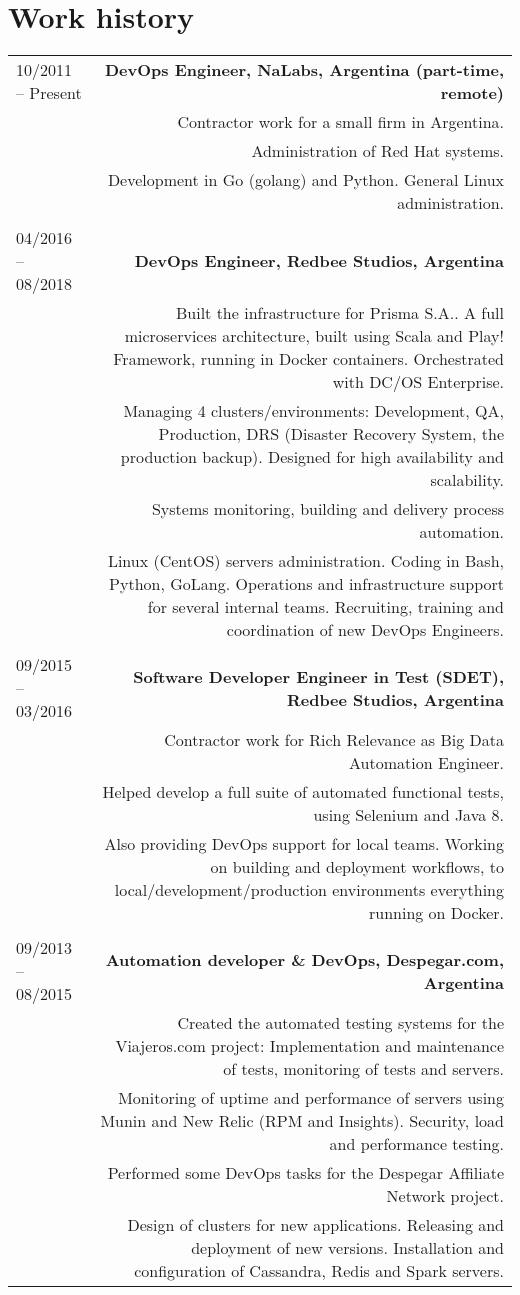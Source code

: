 \documentclass{vitae}
\begin{document}
\section*{Work history}
\begin{tabular}{L!{\VRule}R}
10/2011 -- Present&{\bf DevOps Engineer, NaLabs, Argentina (part-time, remote)}\\
&Contractor work for a small firm in Argentina.\\
&Administration of Red Hat systems.\\
&Development in Go (golang) and Python. General Linux administration.\\
\\
04/2016 -- 08/2018&{\bf DevOps Engineer, Redbee Studios, Argentina}\\
&Built the infrastructure for Prisma S.A.. A full microservices architecture, built using Scala and Play! Framework, running in Docker containers. Orchestrated with DC/OS Enterprise.\\
&Managing 4 clusters/environments: Development, QA, Production, DRS (Disaster Recovery System, the production backup). Designed for high availability and scalability.\\
&Systems monitoring, building and delivery process automation.\\
&Linux (CentOS) servers administration. Coding in Bash, Python, GoLang. Operations and infrastructure support for several internal teams. Recruiting, training and coordination of new DevOps Engineers.\\
\\
09/2015 -- 03/2016&{\bf Software Developer Engineer in Test (SDET), Redbee Studios, Argentina}\\
&Contractor work for Rich Relevance as Big Data Automation Engineer.\\
&Helped develop a full suite of automated functional tests, using Selenium and Java 8.\\
&Also providing DevOps support for local teams. Working on building and deployment workflows, to local/development/production environments everything running on Docker.\\
\\
09/2013 -- 08/2015&{\bf Automation developer \& DevOps, Despegar.com, Argentina}\\
&Created the automated testing systems for the Viajeros.com project: Implementation and maintenance of tests, monitoring of tests and servers.\\
&Monitoring of uptime and performance of servers using Munin and New Relic (RPM and Insights). Security, load and performance testing.\\
&Performed some DevOps tasks for the Despegar Affiliate Network project.\\
&Design of clusters for new applications. Releasing and deployment of new versions. Installation and configuration of Cassandra, Redis and Spark servers.\\


\end{tabular}
\end{document}
